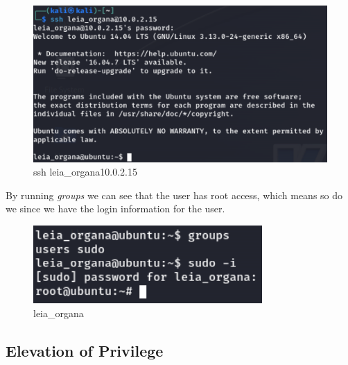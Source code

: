 \begin{figure}[H]
      \centering
      \includegraphics[width=0.8\linewidth]{pic/ssh leia_organa@10.0.2.15.png}
      \caption{ssh leia\_organa\@10.0.2.15}
      \label{fig:ssh leia_organa@10.0.2.15}
\end{figure}

By running \textit{groups} we can see that the user has root access, which means so do we since
we have the login information for the user.


\begin{figure}[H]
      \centering
      \includegraphics[width=0.4\linewidth]{pic/leia_organa.png}
      \caption{leia\_organa}
      \label{fig:leia_organa}
\end{figure}








\subsection{Elevation of Privilege}

